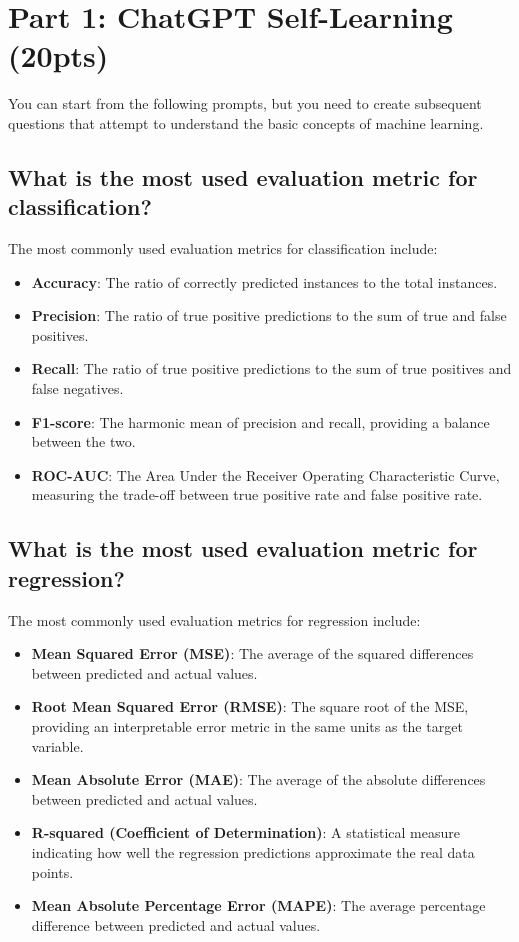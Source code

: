 \section{Part 1: ChatGPT Self-Learning (20pts)}

You can start from the following prompts, but you need to create subsequent questions that attempt to understand the basic concepts of machine learning.

\subsection{What is the most used evaluation metric for classification?}

The most commonly used evaluation metrics for classification include:
\begin{itemize}
    \item \textbf{Accuracy}: The ratio of correctly predicted instances to the total instances.
    \item \textbf{Precision}: The ratio of true positive predictions to the sum of true and false positives.
    \item \textbf{Recall}: The ratio of true positive predictions to the sum of true positives and false negatives.
    \item \textbf{F1-score}: The harmonic mean of precision and recall, providing a balance between the two.
    \item \textbf{ROC-AUC}: The Area Under the Receiver Operating Characteristic Curve, measuring the trade-off between true positive rate and false positive rate.
\end{itemize}


\subsection{What is the most used evaluation metric for regression?}

The most commonly used evaluation metrics for regression include:
\begin{itemize}
    \item \textbf{Mean Squared Error (MSE)}: The average of the squared differences between predicted and actual values.
    \item \textbf{Root Mean Squared Error (RMSE)}: The square root of the MSE, providing an interpretable error metric in the same units as the target variable.
    \item \textbf{Mean Absolute Error (MAE)}: The average of the absolute differences between predicted and actual values.
    \item \textbf{R-squared (Coefficient of Determination)}: A statistical measure indicating how well the regression predictions approximate the real data points.
    \item \textbf{Mean Absolute Percentage Error (MAPE)}: The average percentage difference between predicted and actual values.
\end{itemize}


